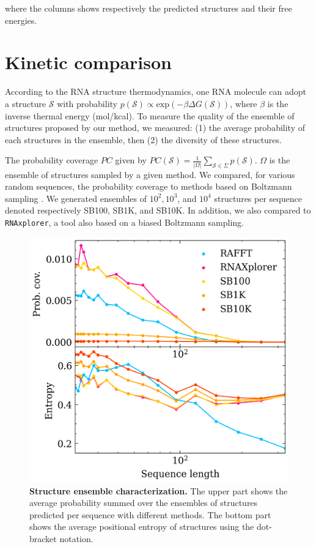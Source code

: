 \noindent where the columns shows respectively the predicted structures and their free energies.

\section{Kinetic comparison}
\label{app:sec:kinetic}
According to the RNA structure thermodynamics, one RNA molecule can adopt a
structure $\mathcal{S}$ with probability $p(\mathcal{S}) \propto \text{exp}(-\beta \Delta G(\mathcal{S}))$,
where \(\beta\) is the inverse thermal energy (mol/kcal). To measure the quality
of the ensemble of structures proposed by our method, we measured: (1) the
average probability of each structures in the ensemble, then (2) the diversity
of these structures.

The probability coverage $PC$ given by $PC(\mathcal{S}) = \frac{1}{|\Omega|}\sum_{\mathcal{S}\in
	\Sigma} p(\mathcal{S})$. $\Omega$ is the ensemble of structures sampled by a given
method. We compared, for various random sequences, the probability coverage to
methods based on Boltzmann sampling
\cite{hofacker03_vienn_rna_secon_struc_server,entzian2021rnaxplorer}. We
generated ensembles of $10^2, 10^3$, and $10^4$ structures per sequence denoted
respectively SB100, SB1K, and SB10K. In addition, we also compared to
\texttt{RNAxplorer}, a tool also based on a biased Boltzmann sampling.

\begin{figure}[t!] \centering
	\includegraphics[width=1.\linewidth]{../res/images/rafft/prob_ent.png}
	\caption{\label{struct_ens_char}\textbf{Structure ensemble characterization.} The upper
		part shows the average probability summed over the ensembles of structures
		predicted per sequence with different methods. The bottom part shows the
		average positional entropy of structures using the dot-bracket notation.}
\end{figure}

